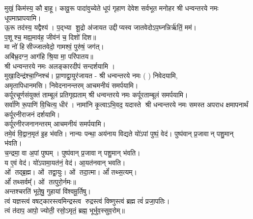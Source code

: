 {मुखं॒ किम॑स्य॒ कौ बा॒हू। कावू॒रू पादा॑वुच्येते}
{धूपं गृहाण देवेश सर्वभूत मनोहर}
श्री धन्वन्तरये नमः धूपमाघ्रापयामि।\\
 
{ऊ॒रू तद॑स्य॒ यद्वैश्य॑। प॒द्भ्या शू॒द्रो अ॑जायत}
उद्दीप्यस्व जातवेदोऽप॒घ्नन्निर्ऋ॑तिं॒ मम॑।\\
 प॒शूश्च॒ मह्य॒माव॑ह॒ जीव॑नं च॒ दिशो॑ दिश॥ \\
मा नो॑ हिसीज्जातवेदो॒ गामश्वं॒ पुरु॑षं॒ जग॑त्।\\
अबि॑भ्र॒दग्न॒ आग॑हि श्रि॒या मा॒ परि॑पातय॥ \\
श्री धन्वन्तरये नमः अलङ्कारदीपं सन्दर्शयामि ।\\

 {मुखा॒दिन्द्र॑श्चा॒ग्निश्च॑। प्रा॒णाद्वा॒युर॑जायत}
- श्री धन्वन्तरये नमः (	) निवेदयामि, \\
अमृतापिधानमसि। निवेदनानन्तरम् आचमनीयं समर्पयामि।\\
{कर्पूरचूर्णसंयुक्तं ताम्बूलं प्रतिगृह्यताम्}
श्री धन्वन्तरये नमः कर्पूरताम्बूलं समर्पयामि।\\

{सर्वा॑णि रू॒पाणि॑ वि॒चित्य॒ धीर॑। नामा॑नि कृ॒त्वाऽभि॒वद॒\an{} यदास्ते}
श्री धन्वन्तरये नमः समस्त अपराध क्षमापनार्थं कर्पूरनीराजनं दर्शयामि।\\
कर्पूरनीरजनानन्तरम् आचमनीयं समर्पयामि।\\

 {तमे॒वं वि॒द्वान॒मृत॑ इ॒ह भ॑वति। नान्यः पन्था॒ अय॑नाय विद्यते}
 यो॑ऽपां पुष्पं॒ वेद॑। पुष्प॑वान् प्र॒जावान् पशु॒मान् भ॑वति।\\
च॒न्द्रमा॒ वा अ॒पां पुष्पम्। पुष्प॑वान् प्र॒जावान् पशु॒मान् भ॑वति।\\
य ए॒वं वेद॑। यो॑ऽपामा॒यत॑नं॒ वेद॑। आ॒यत॑नवान् भवति।\\

ओं तद्ब्र॒ह्म। ओं तद्वा॒युः। ओं तदा॒त्मा। ओं᳚ तथ्स॒त्यम्‌।\\
ओं᳚ तथ्सर्वम्᳚‌। ओं तत्पुरो॒र्नमः॥\\

अन्तश्चरति॑ भूते॒षु॒ गुहायां वि॑श्वमू॒र्तिषु। \\
त्वं यज्ञस्त्वं वषट्कारस्त्वमिन्द्रस्त्व रुद्रस्त्वं विष्णुस्त्वं ब्रह्म त्वं॑ प्रजा॒पतिः। \\
त्वं त॑दाप॒ आपो॒ ज्योती॒ रसो॒ऽमृतं॒ ब्रह्म॒ भूर्भुव॒स्सुव॒रोम्‌॥\\

